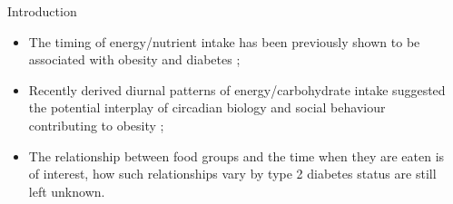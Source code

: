 \documentclass[final, 16pt]{beamer}
\newlength{\sepwidth}
\newlength{\colwidth}
\newcommand{\separatorcolumn}{\begin{column}{\sepwidth}\end{column}}
\begin{document}
\begin{frame}[t]
\begin{columns}[t]
\separatorcolumn

\begin{column}{\colwidth}

  \begin{block}{Introduction}

    \begin{itemize}
	\item The timing of energy/nutrient intake has been previously shown to be associated with obesity and diabetes \cite{Almoosawi2019Chrono};
	\item Recently derived diurnal patterns of energy/carbohydrate intake suggested the potential interplay of circadian biology and social behaviour contributing to obesity \cite{Palla2019};
  \item The relationship between food groups and the time when they are eaten is of interest, how such relationships vary by type 2 diabetes status are still left unknown.
\end{itemize}




%	


\end{block}
\end{column}
\end{columns}
\end{frame}
\end{document}
